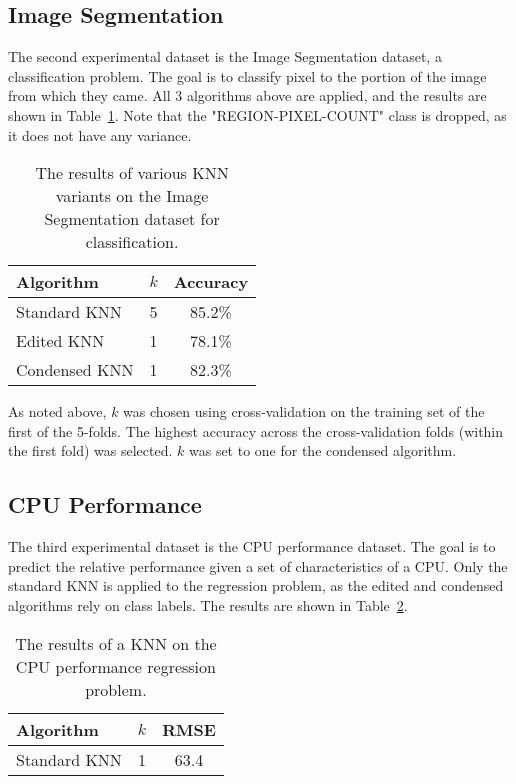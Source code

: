 \documentclass{amsart}
\begin{document}
    \subsection*{Image Segmentation}
    The second experimental dataset is the Image Segmentation dataset\cite{image_dataset}, a classification problem. The goal is to
    classify pixel to the portion of the image from which they came. All 3 algorithms above are applied,
    and the results are shown in Table~\ref{image_segmentation_results}. Note that the "REGION-PIXEL-COUNT"
    class is dropped, as it does not have any variance.
    \begin{table}[H]
    \begin{tabular}{lcc}
        Algorithm     & $k$ & Accuracy \\
        \hline
        Standard KNN  & 5 & 85.2\% \\
        Edited KNN    & 1 & 78.1\% \\
        Condensed KNN & 1 & 82.3\% \\
    \end{tabular}
    \label{image_segmentation_results}
    \caption{The results of various KNN variants on the Image Segmentation dataset for classification.}
    \end{table}
    As noted above, $k$ was chosen using cross-validation on the training set of the first of the 5-folds. The highest
    accuracy across the cross-validation folds (within the first fold) was selected. $k$ was set to one for the
    condensed algorithm.

    \subsection*{CPU Performance}
    The third experimental dataset is the CPU performance dataset\cite{cpu_dataset}. The goal is to predict the relative performance
    given a set of characteristics of a CPU. Only the standard KNN is applied to the regression problem, as the edited
    and condensed algorithms rely on class labels. The results are shown in Table~\ref{cpu_performance_results}.
    \begin{table}[H]
    \begin{tabular}{lcc}
        Algorithm     & $k$ & RMSE \\
        \hline
        Standard KNN  & 1 & 63.4
    \end{tabular}
    \label{cpu_performance_results}
    \caption{The results of a KNN on the CPU performance regression problem.}
    \end{table}
\end{document}
